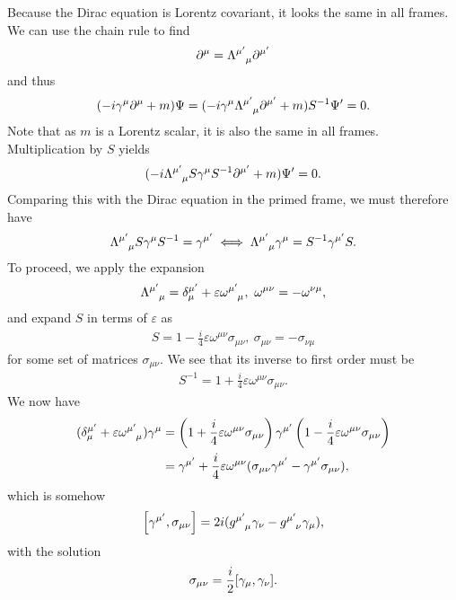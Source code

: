 Because the Dirac equation is Lorentz covariant, it looks the same in all frames. We can use the chain rule to find
\begin{align*}
	\del{\mu}{} = \tensor{\Lambda}{^{\mu\p}_{\mu}}\del{\mu\p}{}
\end{align*}
and thus
\begin{align*}
	(-i\gamma^{\mu}\del{\mu}{} + m)\Psi = (-i\gamma^{\mu}\tensor{\Lambda}{^{\mu\p}_{\mu}}\del{\mu\p}{} + m)S^{-1}\Psi\p = 0.
\end{align*}
Note that as $m$ is a Lorentz scalar, it is also the same in all frames. Multiplication by $S$ yields
\begin{align*}
	(-i\tensor{\Lambda}{^{\mu\p}_{\mu}}S\gamma^{\mu}S^{-1}\del{\mu\p}{} + m)\Psi\p = 0.
\end{align*}
Comparing this with the Dirac equation in the primed frame, we must therefore have
\begin{align*}
	\tensor{\Lambda}{^{\mu\p}_{\mu}}S\gamma^{\mu}S^{-1} = \gamma^{\mu\p} \iff \tensor{\Lambda}{^{\mu\p}_{\mu}}\gamma^{\mu} = S^{-1}\gamma^{\mu\p}S.
\end{align*}
To proceed, we apply the expansion
\begin{align*}
	\tensor{\Lambda}{^{\mu\p}_{\mu}} = \kdelta{\mu\p}{\mu} + \varepsilon\tensor{\omega}{^{\mu\p}_{\mu}},\ \omega^{\mu\nu} = -\omega^{\nu\mu},
\end{align*}
and expand $S$ in terms of $\varepsilon$ as
\begin{align*}
	S = 1 - \frac{i}{4}\varepsilon\omega^{\mu\nu}\sigma_{\mu\nu},\ \sigma_{\mu\nu} = -\sigma_{\nu\mu}
\end{align*}
for some set of matrices $\sigma_{\mu\nu}$. We see that its inverse to first order must be
\begin{align*}
	S^{-1} = 1 + \frac{i}{4}\varepsilon\omega^{\mu\nu}\sigma_{\mu\nu}.
\end{align*}
We now have
\begin{align*}
	(\kdelta{\mu\p}{\mu} + \varepsilon\tensor{\omega}{^{\mu\p}_{\mu}})\gamma^{\mu} &= \left(1 + \frac{i}{4}\varepsilon\omega^{\mu\nu}\sigma_{\mu\nu}\right)\gamma^{\mu\p}\left(1 - \frac{i}{4}\varepsilon\omega^{\mu\nu}\sigma_{\mu\nu}\right) \\
	&= \gamma^{\mu\p} + \frac{i}{4}\varepsilon\omega^{\mu\nu}(\sigma_{\mu\nu}\gamma^{\mu\p} - \gamma^{\mu\p}\sigma_{\mu\nu}),
\end{align*}
which is somehow
\begin{align*}
	\comm{\gamma^{\mu\p}}{\sigma_{\mu\nu}} = 2i(\tensor{g}{^{\mu\p}_{\mu}}\gamma_{\nu} - \tensor{g}{^{\mu\p}_{\nu}}\gamma_{\mu}),
\end{align*}
with the solution
\begin{align*}
	\sigma_{\mu\nu} = \frac{i}{2}\comm{\gamma_{\mu}}{\gamma_{\nu}}.
\end{align*}

